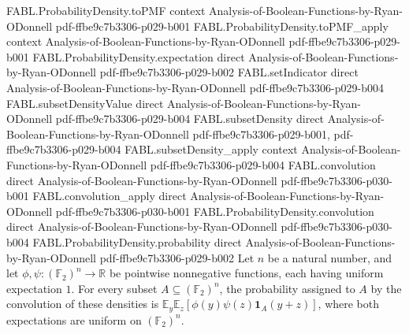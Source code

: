 \begin{theorem}
\proofstep
  {FABL.ProbabilityDensity.toPMF}
  {context}
  {Analysis-of-Boolean-Functions-by-Ryan-ODonnell}
  {pdf-ffbe9c7b3306-p029-b001}
\proofstep
  {FABL.ProbabilityDensity.toPMF_apply}
  {context}
  {Analysis-of-Boolean-Functions-by-Ryan-ODonnell}
  {pdf-ffbe9c7b3306-p029-b001}
\proofstep
  {FABL.ProbabilityDensity.expectation}
  {direct}
  {Analysis-of-Boolean-Functions-by-Ryan-ODonnell}
  {pdf-ffbe9c7b3306-p029-b002}
\proofstep
  {FABL.setIndicator}
  {direct}
  {Analysis-of-Boolean-Functions-by-Ryan-ODonnell}
  {pdf-ffbe9c7b3306-p029-b004}
\proofstep
  {FABL.subsetDensityValue}
  {direct}
  {Analysis-of-Boolean-Functions-by-Ryan-ODonnell}
  {pdf-ffbe9c7b3306-p029-b004}
\proofstep
  {FABL.subsetDensity}
  {direct}
  {Analysis-of-Boolean-Functions-by-Ryan-ODonnell}
  {pdf-ffbe9c7b3306-p029-b001,
    pdf-ffbe9c7b3306-p029-b004}
\proofstep
  {FABL.subsetDensity_apply}
  {context}
  {Analysis-of-Boolean-Functions-by-Ryan-ODonnell}
  {pdf-ffbe9c7b3306-p029-b004}
\proofstep
  {FABL.convolution}
  {direct}
  {Analysis-of-Boolean-Functions-by-Ryan-ODonnell}
  {pdf-ffbe9c7b3306-p030-b001}
\proofstep
  {FABL.convolution_apply}
  {direct}
  {Analysis-of-Boolean-Functions-by-Ryan-ODonnell}
  {pdf-ffbe9c7b3306-p030-b001}
\proofstep
  {FABL.ProbabilityDensity.convolution}
  {direct}
  {Analysis-of-Boolean-Functions-by-Ryan-ODonnell}
  {pdf-ffbe9c7b3306-p030-b004}
\proofstep
  {FABL.ProbabilityDensity.probability}
  {direct}
  {Analysis-of-Boolean-Functions-by-Ryan-ODonnell}
  {pdf-ffbe9c7b3306-p029-b002}
Let $n$ be a natural number, and let $\phi,\psi:(\mathbb{F}_2)^n\to\mathbb{R}$ be
pointwise nonnegative functions, each having uniform expectation $1$. For every subset
$A\subseteq(\mathbb{F}_2)^n$, the probability assigned to $A$ by the convolution of
these densities is $\mathbb{E}_{y}\mathbb{E}_{z}[\phi(y)\psi(z)\mathbf{1}_A(y+z)]$,
where both expectations are uniform on $(\mathbb{F}_2)^n$.
\end{theorem}

